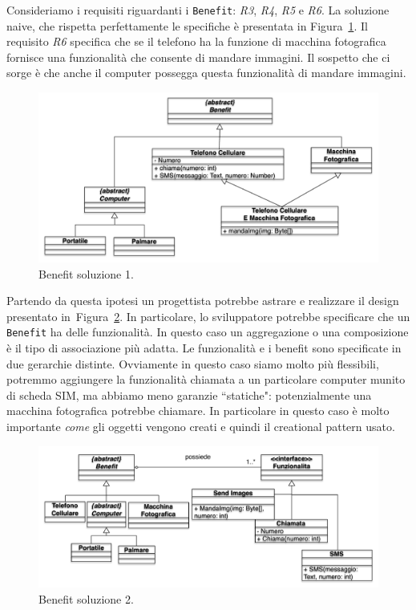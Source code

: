 \documentclass{article}
\begin{document}
Consideriamo i requisiti riguardanti i \texttt{Benefit}: \emph{R3}, \emph{R4}, \emph{R5} e \emph{R6}. La soluzione naive, che rispetta perfettamente le specifiche \`e presentata in Figura~\ref{Fig:benefit1}.  Il requisito \emph{R6} specifica che se il telefono ha la funzione di macchina fotografica fornisce una funzionalit\`a che consente di mandare immagini. Il sospetto che ci sorge \`e che anche il computer possegga questa funzionalit\`a di mandare immagini.

\begin{figure}[h!]
  \centering
    \includegraphics[width=1\textwidth]{Img/benefit1.pdf}
    \caption{Benefit soluzione 1.}
      \label{Fig:benefit1}
\end{figure}
Partendo da questa ipotesi un progettista potrebbe astrare e realizzare il design presentato in~Figura~\ref{Fig:benefit2}. In particolare, lo sviluppatore potrebbe specificare che un \texttt{Benefit} ha delle funzionalit\`a. In questo caso un aggregazione o una composizione \`e il tipo di associazione pi\`u adatta. Le funzionalit\`a e i benefit sono specificate in due gerarchie distinte. Ovviamente in questo caso siamo molto pi\`u flessibili, potremmo aggiungere la funzionalit\`a chiamata a un particolare computer munito di scheda SIM, ma abbiamo meno garanzie ``statiche": potenzialmente una macchina fotografica potrebbe chiamare. In particolare in questo caso \`e molto importante \emph{come} gli oggetti vengono creati e quindi il creational pattern usato.
\begin{figure}[h!]
  \centering
    \includegraphics[width=1\textwidth]{Img/benefit2.pdf}
    \caption{Benefit soluzione 2.}
      \label{Fig:benefit2}
\end{figure}
\end{document}
